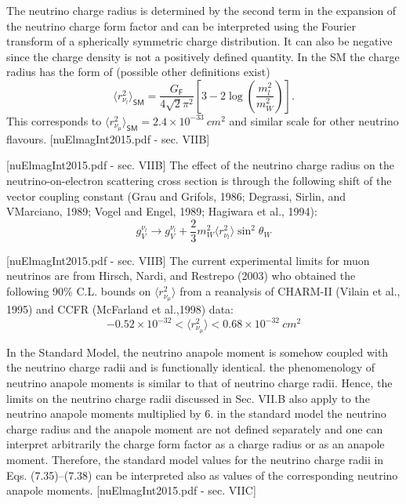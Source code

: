 The neutrino charge radius is determined by the second term in the expansion of the neutrino charge form factor and can be interpreted using the Fourier transform of a spherically symmetric charge distribution. It can also be negative since the charge density is not a positively defined quantity. In the SM the charge radius has the form of (possible other definitions exist)
\begin{equation}
\langle r_{\nu_l}^2\rangle_{\textsf{SM}}=\frac{G_{\textsf{F}}}{4\sqrt{2}\pi^2}\left[3-2\log\left(\frac{m_l^2}{m_W^2}\right)\right].
\end{equation}
This corresponds to $\langle r_{\nu_{\mu}}^2\rangle_{\textsf{SM}}=2.4\times 10^{-33}\ \unit{cm^2}$ and similar scale for other neutrino flavours. [nuElmagInt2015.pdf - sec. VIIB]

[nuElmagInt2015.pdf - sec. VIIB]
The effect of the neutrino charge radius on the neutrino-on-electron scattering cross section is through the following shift of the vector coupling constant (Grau and Grifols, 1986; Degrassi, Sirlin, and VMarciano, 1989; Vogel and Engel, 1989; Hagiwara et al., 1994):
\begin{equation}
g_V^{\nu_l}\rightarrow g_V^{\nu_l}+\frac{2}{3}m_W^2\langle r_{\nu_l}^2\rangle\sin^2\theta_W
\end{equation}

[nuElmagInt2015.pdf - sec. VIIB]
The current experimental limits for muon neutrinos are from   Hirsch, Nardi, and Restrepo (2003) who obtained the
following 90\% C.L. bounds on $\langle r_{\nu_\mu}^2\rangle$ from a reanalysis of
CHARM-II (Vilain et al., 1995) and CCFR (McFarland et al.,1998) data:
\begin{equation}
-0.52\times 10^{-32}<\langle r_{\nu_\mu}^2\rangle<0.68\times 10^{-32}\ \unit{cm^2}
\end{equation}

In the Standard Model, the neutrino anapole moment is somehow coupled with the neutrino charge radii and is functionally identical. the phenomenology of neutrino anapole moments is similar to that of neutrino charge radii. Hence, the limits on the neutrino charge radii discussed in Sec. VII.B also apply to the neutrino anapole moments multiplied by 6.  in the standard model the neutrino charge radius and the anapole moment are not defined separately and one can interpret arbitrarily the charge form factor as a charge radius or as an anapole moment. Therefore, the standard model values for the neutrino charge radii in Eqs. (7.35)–(7.38) can be interpreted also as values of the corresponding neutrino anapole moments. [nuElmagInt2015.pdf - sec. VIIC]


